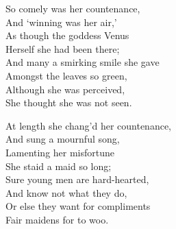 \settowidth{\versewidth}{So comely was her countenance,}
\begin{dcverse}\begin{altverse}
So comely was her countenance,\\
And ‘winning was her air,’\\
As though the goddess Venus\\
Herself she had been there;\\
And many a smirking smile she gave\\
Amongst the leaves so green,\\
Although she was perceived,\\
She thought she was not seen.
\end{altverse}

\begin{altverse}
At length she chang’d her countenance,\\
And sung a mournful song,\\
Lamenting her misfortune\\
She staid a maid so long;\\
Sure young men are hard-hearted,\\
And know not what they do,\\
Or else they want for compliments\\
Fair maidens for to woo.
\end{altverse}
\end{dcverse}
\pagebreak


